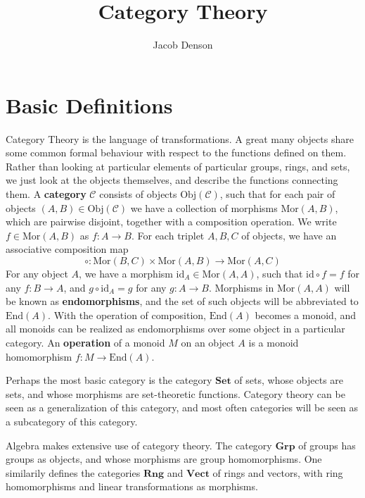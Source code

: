 

\title{Category Theory}
\author{Jacob Denson}



\maketitle
\tableofcontents

\chapter{Basic Definitions}


Category Theory is the language of transformations. A great many objects share some common formal behaviour with respect to the functions defined on them. Rather than looking at particular elements of particular groups, rings, and sets, we just look at the objects themselves, and describe the functions connecting them. A {\bf category} $\mathcal{C}$ consists of objects $\text{Obj}(\mathcal{C})$, such that for each pair of objects $(A,B) \in \text{Obj}(\mathcal{C})$ we have a collection of morphisms $\text{Mor}(A,B)$, which are pairwise disjoint, together with a composition operation. We write $f \in \text{Mor}(A,B)$ as $f:A \to B$. For each triplet $A,B,C$ of objects, we have an associative composition map
%
\[ \circ: \text{Mor}(B,C) \times \text{Mor}(A,B) \to \text{Mor}(A,C) \]
%
For any object $A$, we have a morphism $\text{id}_A \in \text{Mor}(A,A)$, such that $\text{id} \circ f = f$ for any $f: B \to A$, and $g \circ \text{id}_A = g$ for any $g: A \to B$. Morphisms in $\text{Mor}(A,A)$ will be known as {\bf endomorphisms}, and the set of such objects will be abbreviated to $\text{End}(A)$. With the operation of composition, $\text{End}(A)$ becomes a monoid, and all monoids can be realized as endomorphisms over some object in a particular category. An {\bf operation} of a monoid $M$ on an object $A$ is a monoid homomorphism $f: M \to \text{End}(A)$.

\begin{example}
    Perhaps the most basic category is the category $\mathbf{Set}$ of sets, whose objects are sets, and whose morphisms are set-theoretic functions. Category theory can be seen as a generalization of this category, and most often categories will be seen as a subcategory of this category.
\end{example}

\begin{example}
    Algebra makes extensive use of category theory. The category $\mathbf{Grp}$ of groups has groups as objects, and whose morphisms are group homomorphisms. One similarily defines the categories $\mathbf{Rng}$ and $\mathbf{Vect}$ of rings and vectors, with ring homomorphisms and linear transformations as morphisms.
\end{example}

